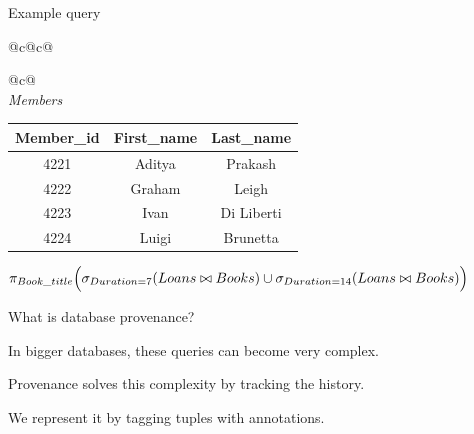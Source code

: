 \documentclass{beamer}
\begin{document}
\begin{frame}{Example query}
{\begin{tabular}{@{}c@{\hspace{1.5cm}}c@{}}
\begin{tabular}{@{}c@{}}
        \\[1.8cm]

        \textit{Members} \\[0.15cm]
        \begin{tabular}{|c|c|c|}
          \hline
          \textbf{Member\_id} & \textbf{First\_name} & \textbf{Last\_name} \\ \hline
          4221                & Aditya               & Prakash             \\ \hline
          4222                & Graham               & Leigh               \\ \hline
          4223                & Ivan                 & Di Liberti          \\ \hline
          4224                & Luigi                & Brunetta            \\ \hline
        \end{tabular}
      \end{tabular}
    \end{tabular}
  }\pause

  \bigskip

  $\pi_{Book\_title}\Bigl(\sigma_{Duration=7}(Loans \bowtie Books) \cup \sigma_{Duration=14}(Loans \bowtie Books)\Bigr)$
\end{frame}

\begin{frame}{What is database provenance?}
  \pause

  In bigger databases, these queries can become very complex.\pause

  \bigskip

  Provenance solves this complexity by tracking the history.\pause

  \bigskip

  We represent it by tagging tuples with annotations.
\end{frame}
\end{document}
